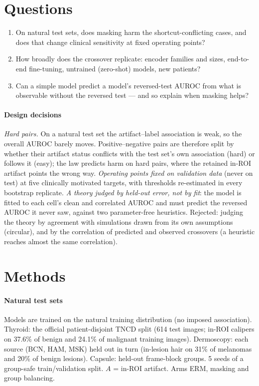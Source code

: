 \section{Questions}
\begin{enumerate}[label=\textbf{Q5\alph*},leftmargin=*]\itemsep1pt
\item On natural test sets, does masking harm the shortcut-conflicting cases, and does that change clinical
sensitivity at fixed operating points?
\item How broadly does the crossover replicate: encoder families and sizes, end-to-end fine-tuning, untrained
(zero-shot) models, new patients?
\item Can a simple model predict a model's reversed-test AUROC from what is observable without the reversed test --- and
so explain when masking helps?
\end{enumerate}
\paragraph{Design decisions} \emph{Hard pairs.} On a natural test set the artifact--label association is weak, so the
overall AUROC barely moves. Positive--negative pairs are therefore split by whether their artifact status conflicts with
the test set's own association (hard) or follows it (easy); the law predicts harm on hard pairs, where the retained
in-ROI artifact points the wrong way. \emph{Operating points fixed on validation data} (never on test) at five clinically
motivated targets, with thresholds re-estimated in every bootstrap replicate. \emph{A theory judged by held-out error,
not by fit}: the model is fitted to each cell's clean and correlated AUROC and must predict the reversed AUROC it never
saw, against two parameter-free heuristics. Rejected: judging the theory by agreement with simulations drawn from its own
assumptions (circular), and by the correlation of predicted and observed crossovers (a heuristic reaches almost the same
correlation).

\section{Methods}
\paragraph{Natural test sets} Models are trained on the natural training distribution (no imposed association).
Thyroid: the official patient-disjoint TNCD split \citep{gong2022acl} (614 test images; in-ROI calipers on 37.6\% of benign
and 24.1\% of malignant training images). Dermoscopy: each source (BCN, HAM, MSK) held out in turn (in-lesion hair on 31\%
of melanomas and 20\% of benign lesions). Capsule: held-out frame-block groups. 5 seeds of a group-safe train/validation
split. $A$ = in-ROI artifact. Arms ERM, masking and group balancing.

